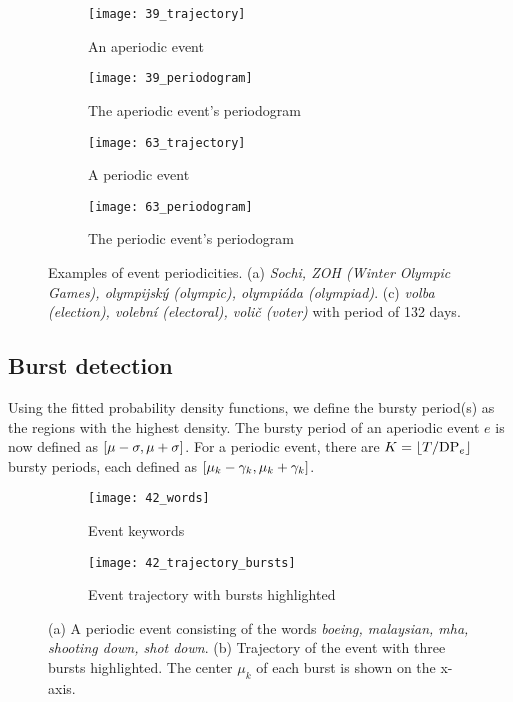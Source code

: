 \begin{figure}[H]
  \begin{subfigure}[b]{0.5\linewidth}
    \centering
    \texttt{[image: 39\_trajectory]} 
    \caption{An aperiodic event} 
    \label{fig:aperiodic-trajectory} 
    \vspace{4ex}
  \end{subfigure}%
  \begin{subfigure}[b]{0.5\linewidth}
    \centering
    \texttt{[image: 39\_periodogram]} 
    \caption{The aperiodic event's periodogram} 
    \label{fig:aperiodic-periodogram} 
    \vspace{4ex}
  \end{subfigure} 
  \begin{subfigure}[b]{0.5\linewidth}
    \centering
    \texttt{[image: 63\_trajectory]} 
    \caption{A periodic event} 
    \label{fig:periodic-trajectory} 
  \end{subfigure}%
  \begin{subfigure}[b]{0.5\linewidth}
    \centering
    \texttt{[image: 63\_periodogram]} 
    \caption{The periodic event's periodogram} 
    \label{fig:periodic-periodogram} 
  \end{subfigure} 
  \caption{Examples of event periodicities. (a) \textit{Sochi, ZOH (Winter Olympic Games), olympijský (olympic), olympiáda (olympiad)}. (c) \textit{volba (election), volební (electoral), volič (voter)} with period of 132 days.}
\end{figure}


\subsection{Burst detection}
Using the fitted probability density functions, we define the bursty period(s) as the regions with the highest density. The bursty period of an aperiodic event $e$ is now defined as $\interval{\mu - \sigma}{\mu + \sigma}$. For a periodic event, there are $K = \lfloor T / \text{DP}_{e}\rfloor$ bursty periods, each defined as $\interval{\mu_{k} - \gamma_{k}}{\mu_{k} + \gamma_{k}}$.

\newpage


\begin{figure}[H]
\centering
\begin{subfigure}{.5\textwidth}
  \centering
  \texttt{[image: 42\_words]}  %
  \caption{Event keywords}
  \label{fig:boeing-words}
\end{subfigure}%
\begin{subfigure}{.5\textwidth}
  \centering
  \texttt{[image: 42\_trajectory\_bursts]}  %
  \caption{Event trajectory with bursts highlighted}
  \label{fig:boeing-trajectory}
\end{subfigure}
\caption{(a) A periodic event consisting of the words \textit{boeing, malaysian, mha, shooting down, shot down}. (b) Trajectory of the event with three bursts highlighted. The center $\mu_{k}$ of each burst is shown on the x-axis.}
\end{figure}


